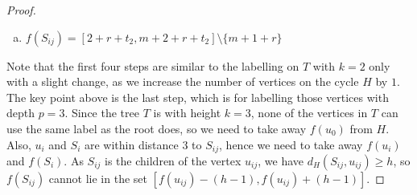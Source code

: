 \begin{proof}
\begin{enumerate}[(4.1)]
\begin{enumerate}[(a)]
\item $f(S_{ij}) = [ 2+r+t_2, m+2+r+t_2] \setminus \{m+1+r\}$
\end{enumerate}
\end{enumerate}
Note that the first four steps are similar to the labelling on $T$ with $k = 2$ only with a slight change, as we increase the number of vertices on the cycle $H$ by $1$. The key point above is the last step, which is for labelling those vertices with depth $p = 3$. Since the tree $T$ is with height $k = 3$, none of the vertices in $T$ can use the same label as the root does, so we need to take away $f(u_0)$ from $H$. Also, $u_i$ and $S_i$ are within distance $3$ to $S_{ij}$, hence we need to take away $f(u_i)$ and $f(S_i)$. As $S_{ij}$ is the children of the vertex $u_{ij}$, we have $d_H(S_{ij}, u_{ij}) \ge h$, so $f(S_{ij})$ cannot lie in the set $[f(u_{ij}) - (h-1), f(u_{ij}) + (h-1)]$. 


\end{proof}
